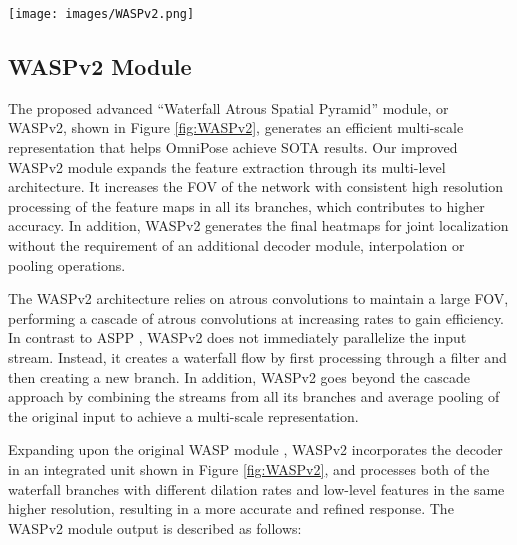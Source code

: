 \documentclass[10pt,twocolumn,letterpaper]{article}
\begin{document}
\begin{figure*}
\begin{center}
\texttt{[image: images/WASPv2.png]}
\end{center}
  \caption{The proposed WASPv2 advanced waterfall module. The inputs are 48 features maps from the modified HRNet backbone and low-level features from the initial layers of the framework.}
\label{fig:WASPv2}
\end{figure*}

\subsection{WASPv2 Module}


The proposed advanced ``Waterfall Atrous Spatial Pyramid'' module, or WASPv2, shown in Figure \ref{fig:WASPv2}, generates an efficient multi-scale representation that helps OmniPose achieve SOTA results. Our improved WASPv2 module expands the feature extraction through its multi-level architecture. It increases the FOV of the network with consistent high resolution processing of the feature maps in all its branches, which contributes to higher accuracy.
In addition, WASPv2 generates the final heatmaps for joint localization without the requirement of an additional decoder module, interpolation or pooling operations.





The WASPv2 architecture relies on atrous convolutions to maintain a large FOV, performing a cascade of atrous convolutions at increasing rates to gain efficiency. In contrast to ASPP \cite{DeepLabv3+}, WASPv2 does not immediately parallelize the input stream. Instead, it creates a waterfall flow by first processing through a filter and then creating a new branch. In addition, WASPv2 goes beyond the cascade approach by combining the streams from all its branches and average pooling of the original input to achieve a multi-scale representation.



Expanding upon the original WASP module \cite{UniPose}, WASPv2 incorporates the decoder in an integrated unit shown in Figure \ref{fig:WASPv2}, and processes both of the waterfall branches with different dilation rates and low-level features in the same higher resolution, resulting in a more accurate and refined response.
The WASPv2 module output  is described as follows:
\vspace{-0.1in}
\end{document}
